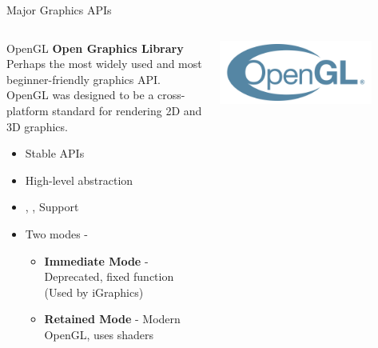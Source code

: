 \begin{frame}{Major Graphics APIs}
  \small
  \begin{columns}
    \begin{column}{0.7\textwidth}
      \begin{conceptbox}{OpenGL}
        \textbf{Open Graphics Library}\\
        Perhaps the most widely used and most beginner-friendly graphics API.
        OpenGL was designed to be a cross-platform standard for rendering 2D and 3D graphics.
        \begin{itemize}
          \item Stable APIs
          \item High-level abstraction
          \item {}, ,  Support
          \item Two modes -
            \begin{itemize}
              \item \textbf{Immediate Mode} - Deprecated, fixed function (Used by iGraphics)
              \item \textbf{Retained Mode} - Modern OpenGL, uses shaders
            \end{itemize}
        \end{itemize}
      \end{conceptbox}
    \end{column}
    \begin{column}{0.3\textwidth}
      \begin{center}
        \includegraphics[width=0.8\textwidth]{images/Opengl-logo.png}
      \end{center}
    \end{column}
  \end{columns}
\end{frame}

